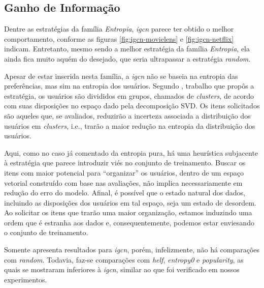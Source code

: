 \subsection{Ganho de Informação}

Dentre as estratégias da família \textit{Entropia}, \textit{igcn} parece ter obtido o melhor comportamento, conforme as figuras \ref{fig:igcn-movielens} e \ref{fig:igcn-netflix} indicam. Entretanto, mesmo sendo a melhor estratégia da família \textit{Entropia}, ela ainda fica muito aquém do desejado, que seria ultrapassar a estratégia \textit{random}.

Apesar de estar inserida nesta família, a \textit{igcn} não se baseia na entropia das preferências, mas sim na entropia dos usuários. Segundo \citep{Rashid:2008:LPN:1540276.1540302}, trabalho que propôs a estratégia, os usuários são divididos em grupos, chamados de \textit{clusters}, de acordo com suas disposições no espaço dado pela decomposição SVD. Os itens solicitados são aqueles que, se avaliados, reduzirão a incerteza associada a distribuição dos usuários em \textit{clusters}, i.e., trarão a maior redução na entropia da distribuição dos usuários.

Aqui, como no caso já comentado da entropia pura, há uma heurística subjacente à estratégia que parece introduzir viés no conjunto de treinamento. Buscar os itens com maior potencial para ``organizar'' os usuários, dentro de um espaço vetorial construído com base nas avaliações, não implica necessariamente em redução do erro do modelo. Afinal, é possível que o estado natural dos dados, incluindo as disposições dos usuários em tal espaço, seja um estado de desordem. Ao solicitar os itens que trarão uma maior organização, estamos induzindo uma ordem que é estranha aos dados e, consequentemente, podemos estar enviesando o conjunto de treinamento.

Somente \citep{Rashid:2008:LPN:1540276.1540302} apresenta resultados para \textit{igcn}, porém, infelizmente, não há comparações com \textit{random}. Todavia, faz-se comparações com \textit{helf}, \textit{entropy0} e \textit{popularity}, as quais se mostraram inferiores à \textit{igcn}, similar ao que foi verificado em nossos experimentos.


